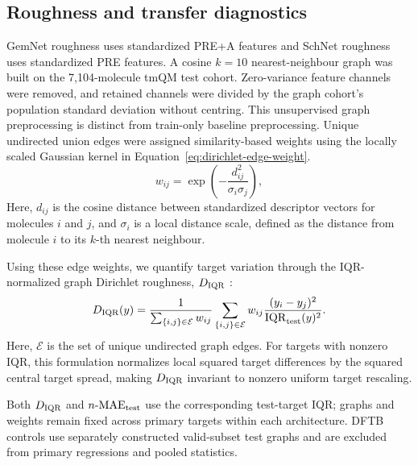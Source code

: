 \subsection{Roughness and transfer diagnostics}
\label{sec:methods-roughness-diagnostics}

GemNet roughness uses standardized PRE+A features and SchNet roughness uses standardized PRE features. A cosine \(k=10\) nearest-neighbour graph was built on the 7,104-molecule tmQM test cohort. Zero-variance feature channels were removed, and retained channels were divided by the graph cohort's population standard deviation without centring. This unsupervised graph preprocessing is distinct from train-only baseline preprocessing. Unique undirected union edges were assigned similarity-based weights using the locally scaled Gaussian kernel in Equation~\ref{eq:dirichlet-edge-weight}.
\begin{equation}
  w_{ij}=\exp\!\left(-\frac{d_{ij}^{2}}{\sigma_i\sigma_j}\right),
  \label{eq:dirichlet-edge-weight}
\end{equation}
Here, \(d_{ij}\) is the cosine distance between standardized descriptor vectors for molecules \(i\) and \(j\), and \(\sigma_i\) is a local distance scale, defined as the distance from molecule \(i\) to its \(k\)-th nearest neighbour.

Using these edge weights, we quantify target variation through the IQR-normalized graph Dirichlet roughness, \(D_{\rm IQR}\) \cite{belkin2006manifold}:
\begin{equation}
  D_{\rm IQR}(y)=\frac{1}{\sum_{\{i,j\}\in\mathcal E}w_{ij}}
  \sum_{\{i,j\}\in\mathcal E}
  w_{ij}\frac{(y_i-y_j)^2}{\operatorname{IQR}_{\rm test}(y)^2}.
  \label{eq:dirichlet-roughness}
\end{equation}
Here, \(\mathcal E\) is the set of unique undirected graph edges. For targets with nonzero IQR, this formulation normalizes local squared target differences by the squared central target spread, making \(D_{\rm IQR}\) invariant to nonzero uniform target rescaling.

Both \(D_{\rm IQR}\) and \(n\text{-MAE}_{\rm test}\) use the corresponding test-target IQR; graphs and weights remain fixed across primary targets within each architecture. DFTB controls use separately constructed valid-subset test graphs and are excluded from primary regressions and pooled statistics.


